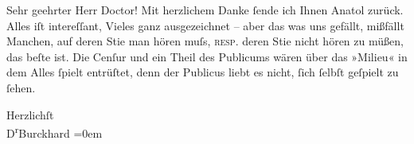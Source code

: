 \pstart{}Sehr geehrter Herr Doctor!\pend\vspace{0.5em}
\pstart
           Mit herzlichem Danke{ }ſende ich Ihnen Anatol
               zurück. Alles iſt intereſſant, Vieles ganz ausgezeichnet – aber das was uns gefällt,
               mißfällt Manchen, auf deren Sti{\geminationm}e man hören muſs, \textsc{resp.} deren Sti{\geminationm}e nicht hören
               zu müßen, das beſte ist. Die Cenſur und ein Theil des Publicums wären über das
               »Milieu« in dem Alles{ }ſpielt entrüſtet, denn {\pb}der Publicus liebt es nicht,{ }ſich{ }ſelbſt
               geſpielt zu{ }ſehen.\pend
           
\pstart
           Herzlichſt{\\[\baselineskip]}\spacefill\mbox{D\textsuperscript{r}Burckhard}\pend
           \leftskip=0em{}\endnumbering{}  \newcommand{\dateiname}{L00344}\newcommand{\titel}{Max Burckhard an Arthur Schnitzler, 2. 7. 1894}\newcommand{\editorInnen}{Martin Anton Müller und Gerd-Hermann Susen}

